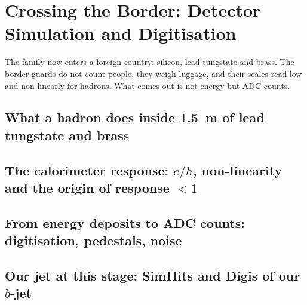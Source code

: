 \chapter{Crossing the Border: Detector Simulation and Digitisation}
\label{ch:crossing_the_border}

\begin{journeybox}
The family now enters a foreign country: silicon, lead tungstate and brass. The
border guards do not count people, they weigh luggage, and their scales read low
and non-linearly for hadrons. What comes out is not energy but ADC counts.
\end{journeybox}


\section{What a hadron does inside 1.5~m of lead tungstate and brass}
\label{sec:crossing_the_border:what_a_hadron_does_inside_1_5_m_of_lead_}

\section{The calorimeter response: $e/h$, non-linearity and the origin of response $<1$}
\label{sec:crossing_the_border:the_calorimeter_response_e_h_non_lineari}

\section{From energy deposits to ADC counts: digitisation, pedestals, noise}
\label{sec:crossing_the_border:from_energy_deposits_to_adc_counts_digit}

\section{Our jet at this stage: SimHits and Digis of our $b$-jet}
\label{sec:crossing_the_border:our_jet_at_this_stage_simhits_and_digis_}

